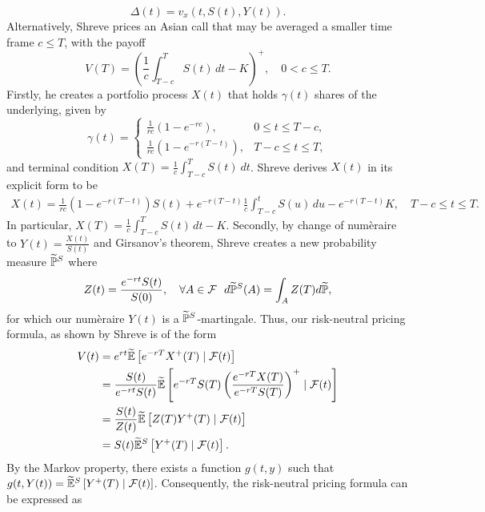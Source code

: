 \begin{equation*}
    \Delta(t) = v_x(t, S(t), Y(t)).
\end{equation*}
Alternatively, Shreve prices an Asian call that may be averaged a smaller time frame $c \leq T$, with the payoff
\begin{equation*}
    V(T) = \left(\frac{1}{c} \int_{T-c}^{T} S(t) \, dt - K\right)^+,\quad 0 < c \leq T.
\end{equation*}
Firstly, he creates a portfolio process $X(t)$
that holds $\gamma(t)$ shares of the underlying, given by
\begin{equation*}
    \gamma(t) = 
\begin{cases} 
    \frac{1}{rc}(1 - e^{-rc}), & 0 \leq t \leq T - c, \\[8pt]
    \frac{1}{rc} \left(1 - e^{-r(T - t)}\right), & T - c \leq t \leq T,
\end{cases}        
\end{equation*}
and terminal condition $X(T) = \frac{1}{c}\int_{T-c}^T S(t)\ dt $.
Shreve \cite{shreve2004stochastic} derives $X(t)$ in its explicit form to be
\begin{align*}
    X(t) = \frac{1}{rc} \left(1 - e^{-r(T - t)}\right) S(t) 
+ e^{-r(T - t)} \frac{1}{c} \int_{T - c}^{t} S(u) \, du - e^{-r(T - t)} K, \quad T - c \leq t \leq T.
\end{align*}
In particular, \(X(T) = \frac{1}{c} \int_{T-c}^{T} S(t) \, dt - K\).
Secondly, by change of numèraire to $Y(t) = \frac{X(t)}{S(t)}$ and Girsanov's theorem, Shreve creates a new probability measure $\widetilde{\mathbb{P}}^{S}$ \cite{shreve2004stochastic} where
\begin{equation*}
Z(t) = \frac{e^{-rt}S(t)}{S(0)},\quad\forall A \in \mathcal{F}\ \ d\widetilde{\mathbb{P}}^S(A) = \int_A Z(T) d\widetilde{\mathbb{P}},
\end{equation*}
for which our numèraire $Y(t)$ is a $\widetilde{\mathbb{P}}^S$-martingale. Thus, our risk-neutral pricing formula, as shown by Shreve \cite{shreve2004stochastic} is of the form
\begin{align*}
    V(t) &= e^{rt} \widetilde{\mathbb{E}} \left[ e^{-rT} X^{+}(T) \mid \mathcal{F}(t) \right] \\
&= \frac{S(t)}{e^{-rt} S(t)} \widetilde{\mathbb{E}} \left[  e^{-rT} S(T) \left(\frac{e^{-rT}X(T)}{e^{-rT}S(T)}\right)^{+} \mid \mathcal{F}(t) \right] \\
&= \frac{S(t)}{Z(t)} \widetilde{\mathbb{E}} \left[ Z(T) Y^{+}(T) \mid \mathcal{F}(t) \right]\\
&= S(t) \widetilde{\mathbb{E}}^{S} \left[ Y^{+}(T) \mid \mathcal{F}(t) \right].
\end{align*}
By the Markov property, there exists a function $g(t, y)$ such that \(g(t, Y(t)) = \widetilde{\mathbb{E}}^S \left[ Y^{+}(T) \mid \mathcal{F}(t) \right]\). Consequently, the risk-neutral pricing formula can be expressed as
